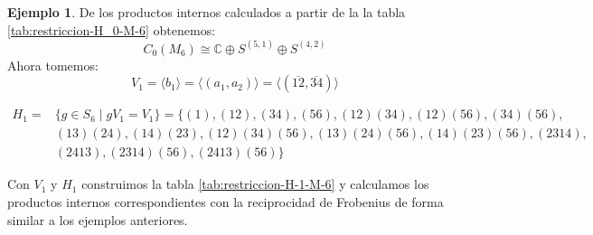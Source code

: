 \documentclass[12pt]{book}
\theoremstyle{definition}
\newtheorem{example}[theorem]{Ejemplo}
\newcounter{in}
\begin{document}
\begin{example}
\begin{table}[!hbtp]
    \caption{Caracteres de $S_{6}$ restringidos a $H_{0}$ y carácter de $V_{0}$}
    \label{tab:restriccion-H_0-M-6}
  \end{table}

  De los productos internos calculados a partir de la la tabla
  \ref{tab:restriccion-H_0-M-6} obtenemos:
  \begin{equation}
    C_{0}(M_{6})\cong \mathbb{C}\oplus S^{(5,1)}\oplus S^{(4,2)}
    \label{C0-M6}
  \end{equation}
  Ahora tomemos:
  \begin{equation*}
    V_{1}=\langle b_{1}\rangle =\langle
    (a_{1},a_{2})\rangle=\langle(\overline{12},\overline{34})\rangle
  \end{equation*}
  \begin{small}
    \begin{align*}
      H_{1}=&\{g \in S_{6}\mid
      gV_{1}=V_{1}\}=\{(1),(12),(34),(56),(12)(34),(12)(56),(34)(56),\\
      &(13)(24),(14)(23),(12)(34)(56),(13)(24)(56),(14)(23)(56),(2314),\\
      &(2413),(2314)(56),(2413)(56)\}
    \end{align*}
  \end{small}
  Con $V_{1}$ y $H_{1}$ construimos la tabla
  \ref{tab:restriccion-H-1-M-6} y calculamos los productos internos
  correspondientes con la reciprocidad de Frobenius de forma similar a los ejemplos anteriores.
  

\end{example}
\end{document}
